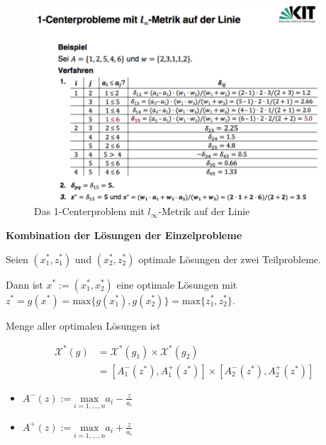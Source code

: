           \begin{figure}[htbp]
            \centering
            \includegraphics[width=0.95\textwidth]{Images/Das_1_Centerproblem_auf_der_Linie_Bsp.png}
            \caption{Das 1-Centerproblem mit $l_{\infty}$-Metrik auf der Linie}
          \end{figure}

          \par \textbf{Kombination der Lösungen der Einzelprobleme}

          \par Seien $(x_1^*, z_1^*)$ und $(x_2^*, z_2^*)$ optimale Lösungen der zwei Teilprobleme.

          \par Dann ist $x^* := (x_1^*, x_2^*)$ eine optimale Lösungen mit $z^* = g(x^*) = \text{max}{\{g(x_1^*), g(x_2^*)\}} = \text{max}{\{z_1^*, z_2^*\}}$.

          \par Menge aller optimalen Lösungen ist

          \begin{equation*}
            \begin{aligned}
              \mathcal{X}^*(g) &= \mathcal{X}^*(g_1) \times \mathcal{X}^*(g_2) \\
                               &= [A_1^-(z^*), A_1^+(z^*)] \times [A_2^-(z^*), A_2^+(z^*)]
            \end{aligned}
          \end{equation*}
          \begin{itemize}
            \item $A^-(z) := \underset{i = 1,\dots, n}{\text{max}}a_i - \frac{z}{a_i}$
            \item $A^+(z) := \underset{i = 1,\dots, n}{\text{max}}a_i + \frac{z}{a_i}$
          \end{itemize}
    
